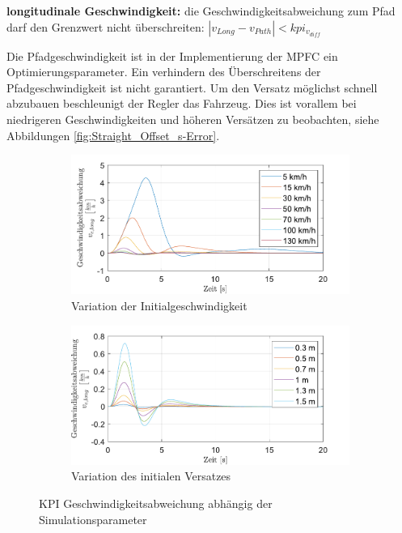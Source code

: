 \medskip\noindent\textbf{longitudinale Geschwindigkeit:} die Geschwindigkeitsabweichung zum Pfad darf den Grenzwert nicht überschreiten: $|v_{Long} - v_{Path}| < kpi_{v_{diff}}$

\noindent Die Pfadgeschwindigkeit ist in der Implementierung der MPFC ein Optimierungsparameter. Ein verhindern des Überschreitens der Pfadgeschwindigkeit ist nicht garantiert. Um den Versatz möglichst schnell abzubauen beschleunigt der Regler das Fahrzeug. Dies ist vorallem bei niedrigeren Geschwindigkeiten und höheren Versätzen zu beobachten, siehe Abbildungen \ref{fig:Straight_Offset_s-Error}.   
\begin{figure}[ht]
    \centering
    \begin{subfigure}[b]{.49\textwidth}
        \centering
        \includegraphics[width=\textwidth]{figures/3_Implementierung/Straight_Offset/varVelo_1mOffset_v-Diff.pdf}
        \caption{Variation der Initialgeschwindigkeit}
        \label{fig:varVelo_1mOffset_v-Diff}
    \end{subfigure}
    \hfill
    \begin{subfigure}[b]{.49\textwidth}
        \centering
        \includegraphics[width=\textwidth]{figures/3_Implementierung/Straight_Offset/varOffset_50kmh_v-Diff.pdf}
        \caption{Variation des initialen Versatzes}
        \label{fig:varOffset_50kmh_v-Diff}
    \end{subfigure}
    \caption{KPI Geschwindigkeitsabweichung abhängig der Simulationsparameter}
    \label{fig:Straight_Offset_v-Diff}
\end{figure}


